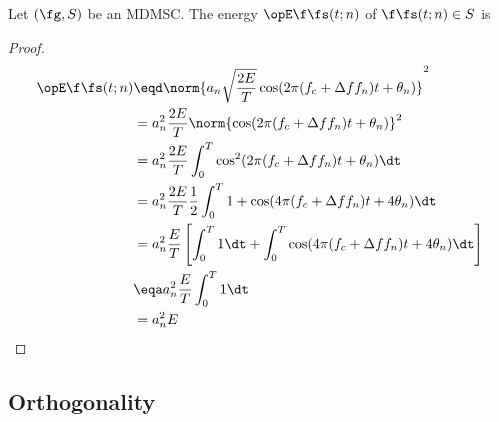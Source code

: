 \begin{theorem}
Let $(\fg,S)$ be an MDMSC.
The energy $\opE \f\fs(t;n)$ of $\f\fs(t;n)\in S$ is
\end{theorem}
\begin{proof}
\begin{align*}
  \opE \f\fs(t;n)
    &\eqd \norm{a_n \sqrt{\frac{2E}{T}} \cos(2\pi(f_c+\Delta f f_n)t+\theta_n)}^2
  \\&= a_n^2 \frac{2E}{T}
       \norm{ \cos(2\pi(f_c+\Delta f f_n)t+\theta_n)}^2
  \\&= a_n^2 \frac{2E}{T}
       \int_0^T \cos^2(2\pi(f_c+\Delta f f_n)t+\theta_n) \dt
  \\&= a_n^2 \frac{2E}{T}\frac{1}{2}
       \int_0^T 1 + \cos(4\pi(f_c+\Delta f f_n)t+4\theta_n) \dt
  \\&= a_n^2 \frac{E}{T}\left[
       \int_0^T 1  \dt +
       \int_0^T \cos(4\pi(f_c+\Delta f f_n)t+4\theta_n) \dt
       \right]
  \\&\eqa a_n^2 \frac{E}{T}  \int_0^T 1  \dt
  \\&=    a_n^2 E
\end{align*}
\end{proof}

\subsection{Orthogonality}

